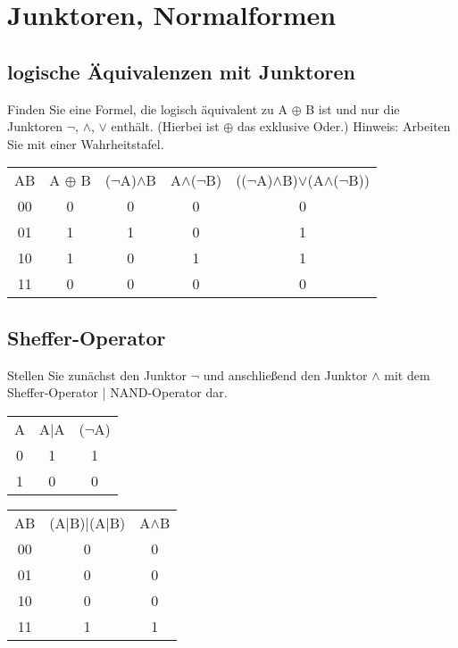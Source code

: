 \section{Junktoren, Normalformen}
\subsection{logische Äquivalenzen mit Junktoren}
    Finden Sie eine Formel, die logisch äquivalent zu A $\oplus$ B ist und nur
    die Junktoren $\neg$, $\wedge$, $\vee$ enthält. (Hierbei ist $\oplus$ das
    exklusive Oder.) Hinweis: Arbeiten Sie mit einer Wahrheitstafel.
{
    \tiny
    \begin{tabular}{ccccc}
        AB & A $\oplus$ B & ($\neg$A)$\wedge$B & A$\wedge$($\neg$B) & 
        (($\neg$A)$\wedge$B)$\vee$(A$\wedge$($\neg$B))\\
        00 & 0 & 0 & 0 & 0\\
        01 & 1 & 1 & 0 & 1\\
        10 & 1 & 0 & 1 & 1\\
        11 & 0 & 0 & 0 & 0
    \end{tabular}
}
\subsection{Sheffer-Operator}
Stellen Sie zunächst den Junktor $\neg$ und anschließend den Junktor $\wedge$
mit dem Sheffer-Operator | NAND-Operator dar.\\
{
    \tiny
    \begin{tabular}{ccc}
        A & A|A & ($\neg$A)\\
        0 & 1 & 1\\
        1 & 0 & 0
    \end{tabular}
    \begin{tabular}{ccc}
        AB & (A|B)|(A|B) & A$\wedge$B\\
        00 & 0 & 0 \\
        01 & 0 & 0 \\
        10 & 0 & 0 \\
        11 & 1 & 1
    \end{tabular}
}
